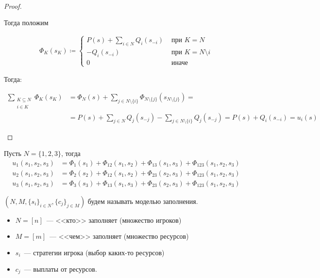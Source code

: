 \begin{proof}
\begin{itemize}
	Тогда положим 

	\begin{align*}
		\Phi_K(s_K) \coloneq \begin{cases}
			P(s) + \sum_{i \in N} Q_i(s_{-i}) &\text{ при } K = N \\
			-Q_i(s_{-i}) &\text{ при } K = N \setminus{i} \\
			0 &\text{ иначе}
		\end{cases}
	\end{align*}

	Тогда:

	\begin{align*}
		\sum_{\substack{K \subseteq N \\ i \in K}} \Phi_K(s_K) &= \Phi_N(s) + \sum_{j \in N \setminus \{i\}} \Phi_{N \setminus \{j\}} (s_{N \setminus \{j\}}) = \\
															   &= P(s) + \sum_{j \in N} Q_j(s_{-j}) - \sum_{j \in N \setminus \{i\}} Q_{j}(s_{-j}) = P(s) + Q_i(s_{-i}) = u_i(s)
	\end{align*}
	\end{itemize}
\end{proof}

\begin{exmpl}
	Пусть $N = \{1, 2, 3\}$, тогда 
	\begin{align*}
		u_1(s_1, s_2, s_3) &= \Phi_1(s_1) + \Phi_{12}(s_1, s_2) + \Phi_{13}(s_1, s_3) + \Phi_{123}(s_1, s_2, s_3) \\
		u_2(s_1, s_2, s_3) &= \Phi_2(s_2) + \Phi_{12}(s_1, s_2) + \Phi_{23}(s_2, s_3) + \Phi_{123}(s_1, s_2, s_3) \\
		u_3(s_1, s_2, s_3) &= \Phi_3(s_3) + \Phi_{13}(s_1, s_3) + \Phi_{23}(s_2, s_3) + \Phi_{123}(s_1, s_2, s_3)
	\end{align*}

\end{exmpl}

\begin{df}
	$(N, M, \{s_i\}_{i \in N}, \{c_j\}_{j \in M})$ будем называть моделью заполнения. 
	\begin{itemize}
	  \item $N = [n]$~--- <<кто>> заполняет (множество игроков)
	  \item $M = [m]$~--- <<чем>> заполняет (множество ресурсов)
	  \item $s_i$~--- стратегии игрока (выбор каких-то ресурсов)
	  \item $c_j$~--- выплаты от ресурсов. 
	\end{itemize}
\end{df}

